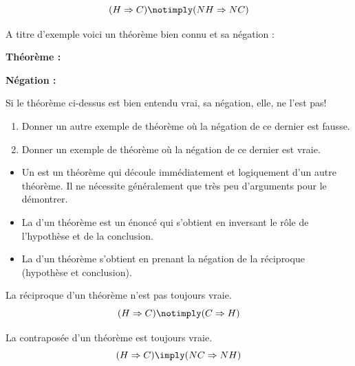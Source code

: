 $$ (H \Rightarrow C) \notimply (NH \Rightarrow NC)$$


\bigskip
A titre d'exemple voici un théorème bien connu et sa négation :

\medskip
\textbf{Théorème :} 

\medskip
\textbf{Négation :} 

\bigskip
Si le théorème ci-dessus est bien entendu vrai, sa négation, elle, ne l'est pas!



\bigskip
\begin{enumerate}[label=\roman*),itemsep=0mm]
\item Donner un autre exemple de théorème où la négation de ce dernier est fausse.
\item Donner un exemple de théorème où la négation de ce dernier est vraie.
\end{enumerate}








\begin{definitions}
\begin{itemize}
\item Un  est un théorème qui découle immédiatement et logiquement d'un autre théorème. Il ne nécessite généralement que très peu d'arguments pour le démontrer.
\item La  d'un théorème est un énoncé qui s'obtient en inversant le rôle de l'hypothèse et de la conclusion.
\item La  d'un théorème s'obtient en prenant la négation de la réciproque (hypothèse et conclusion).
\end{itemize}
\end{definitions}



\bigskip
\begin{remarques}
\item La réciproque d'un théorème n'est pas toujours vraie.
$$ (H \Rightarrow C) \notimply (C \Rightarrow H)$$
\item La contraposée d'un théorème est toujours vraie.
$$ (H \Rightarrow C) \imply (NC \Rightarrow NH)$$
\end{remarques}







